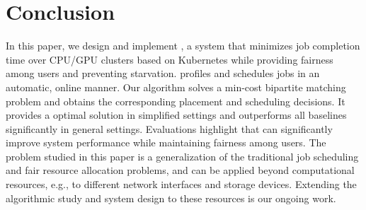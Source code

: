 \section{Conclusion}

In this paper, %
we design and implement \name, a system that minimizes job completion time over CPU/GPU clusters based on Kubernetes while providing fairness among users and preventing starvation. 
\name profiles and schedules jobs in an automatic, online manner. Our algorithm solves a min-cost bipartite matching problem and obtains the corresponding placement and scheduling decisions. 
It provides a optimal solution in simplified settings and outperforms all baselines significantly in general settings. 
Evaluations highlight that \name can significantly improve system performance while maintaining fairness among users.  
The problem studied in this paper is a generalization of the traditional job scheduling and fair resource allocation problems, and can be applied beyond computational resources, e.g., to different network interfaces and storage devices. Extending the algorithmic study and system design to these resources is our ongoing work. 

